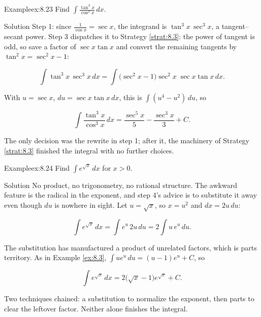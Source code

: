 \documentclass[a4paper,12pt,oneside]{memoir}
\begin{document}
\begin{workedexample}
\begin{envexample}{Example}{ex:8.23}{}
Find \(\displaystyle\int \frac{\tan^{3}x}{\cos^{3}x}\,dx\).
\end{envexample}
\begin{envsolution}{Solution}{}{}
Step 1: since \(\tfrac{1}{\cos x} = \sec x\), the integrand is \(\tan^{3}x\,\sec^{3}x\), a tangent–secant power. Step 3 dispatches it to Strategy \ref{strat:8.3}: the power of tangent is odd, so save a factor of \(\sec x\tan x\) and convert the remaining tangents by \(\tan^{2}x = \sec^{2}x - 1\):

\[ \int \tan^{3}x\,\sec^{3}x\,dx = \int \bigl(\sec^{2}x - 1\bigr)\sec^{2}x\;\sec x\tan x\,dx. \]

With \(u = \sec x\), \(du = \sec x\tan x\,dx\), this is \(\int(u^{4} - u^{2})\,du\), so

\[ \int \frac{\tan^{3}x}{\cos^{3}x}\,dx = \frac{\sec^{5}x}{5} - \frac{\sec^{3}x}{3} + C. \]

The only decision was the rewrite in step 1; after it, the machinery of Strategy \ref{strat:8.3} finished the integral with no further choices. \qedmark
\end{envsolution}
\end{workedexample}
\begin{workedexample}
\begin{envexample}{Example}{ex:8.24}{}
Find \(\displaystyle\int e^{\sqrt{x}}\,dx\) for \(x > 0\).
\end{envexample}
\begin{envsolution}{Solution}{}{}
No product, no trigonometry, no rational structure. The awkward feature is the radical in the exponent, and step 4’s advice is to substitute it away even though \(du\) is nowhere in sight. Let \(u = \sqrt{x}\), so \(x = u^{2}\) and \(dx = 2u\,du\):

\[ \int e^{\sqrt{x}}\,dx = \int e^{u}\,2u\,du = 2\int u\,e^{u}\,du. \]

The substitution has manufactured a product of unrelated factors, which is parts territory. As in Example \ref{ex:8.3}, \(\int u e^{u}\,du = (u - 1)e^{u} + C\), so

\[ \int e^{\sqrt{x}}\,dx = 2\bigl(\sqrt{x} - 1\bigr)e^{\sqrt{x}} + C. \]

Two techniques chained: a substitution to normalize the exponent, then parts to clear the leftover factor. Neither alone finishes the integral. \qedmark
\end{envsolution}
\end{workedexample}
\end{document}
